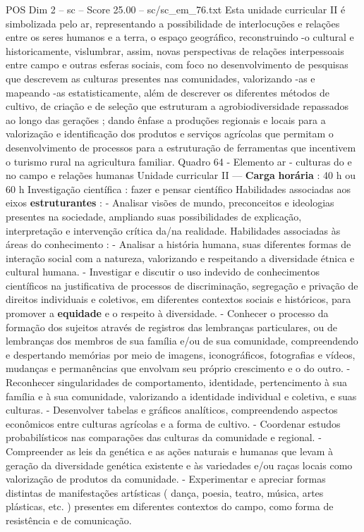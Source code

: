 \begin{textsample}{POS Dim 2 – sc – Score 25.00 – sc/sc\_em\_76.txt}
Esta unidade curricular II é simbolizada pelo ar, representando a possibilidade de interlocuções e relações entre os seres humanos e a terra, o espaço geográfico, reconstruindo -o cultural e historicamente, vislumbrar, assim, novas perspectivas de relações interpessoais entre campo e outras esferas sociais, com foco no desenvolvimento de pesquisas que descrevem as culturas presentes nas comunidades, valorizando -as e mapeando -as estatisticamente, além de descrever os diferentes métodos de cultivo, de criação e de seleção que estruturam a agrobiodiversidade repassados ao longo das gerações ; dando ênfase a produções regionais e locais para a valorização e identificação dos produtos e serviços agrícolas que permitam o desenvolvimento de processos para a estruturação de ferramentas que incentivem o turismo rural na agricultura familiar.
Quadro 64 - Elemento ar - culturas do e no campo e relações humanas Unidade curricular II — \textbf{Carga} \textbf{horária} : 40 h ou 60 h Investigação científica : fazer e pensar científico Habilidades associadas aos eixos \textbf{estruturantes} : - Analisar visões de mundo, preconceitos e ideologias presentes na sociedade, ampliando suas possibilidades de explicação, interpretação e intervenção crítica da/na realidade.
Habilidades associadas às áreas do conhecimento : - Analisar a história humana, suas diferentes formas de interação social com a natureza, valorizando e respeitando a diversidade étnica e cultural humana. - Investigar e discutir o uso indevido de conhecimentos científicos na justificativa de processos de discriminação, segregação e privação de direitos individuais e coletivos, em diferentes contextos sociais e históricos, para promover a \textbf{equidade} e o respeito à diversidade. - Conhecer o processo da formação dos sujeitos através de registros das lembranças particulares, ou de lembranças dos membros de sua família e/ou de sua comunidade, compreendendo e despertando memórias por meio de imagens, iconográficos, fotografias e vídeos, mudanças e permanências que envolvam seu próprio crescimento e o do outro. - Reconhecer singularidades de comportamento, identidade, pertencimento à sua família e à sua comunidade, valorizando a identidade individual e coletiva, e suas culturas. - Desenvolver tabelas e gráficos analíticos, compreendendo aspectos econômicos entre culturas agrícolas e a forma de cultivo. - Coordenar estudos probabilísticos nas comparações das culturas da comunidade e regional. - Compreender as leis da genética e as ações naturais e humanas que levam à geração da diversidade genética existente e às variedades e/ou raças locais como valorização de produtos da comunidade. - Experimentar e apreciar formas distintas de manifestações artísticas ( dança, poesia, teatro, música, artes plásticas, etc. ) presentes em diferentes contextos do campo, como forma de resistência e de comunicação.

\end{textsample}
